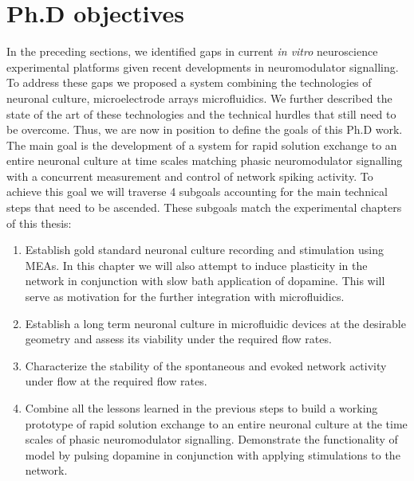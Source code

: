     \section{Ph.D objectives}
    In the preceding sections, we identified gaps in current \textit{in vitro} neuroscience experimental platforms given recent developments in neuromodulator signalling. To address these gaps we proposed a system combining the technologies of neuronal culture, microelectrode arrays microfluidics. We further described the state of the art of these technologies and the technical hurdles that still need to be overcome. Thus, we are now in position to define the goals of this Ph.D work. The main goal is the development of a system for rapid solution exchange to an entire neuronal culture at time scales matching phasic neuromodulator signalling with a concurrent measurement and control of network spiking activity. To achieve this goal we will traverse 4 subgoals accounting for the main technical steps that need to be ascended. These subgoals match the experimental chapters of this thesis:

    \begin{enumerate}
    \item Establish gold standard neuronal culture recording and stimulation using MEAs. In this chapter we will also attempt to induce plasticity in the network in conjunction with slow bath application of dopamine. This will serve as motivation for the further integration with microfluidics.

    \item Establish a long term neuronal culture in microfluidic devices at the desirable geometry and assess its viability under the required flow rates.

    \item Characterize the stability of the spontaneous and evoked network activity under flow at the required flow rates.

    \item Combine all the lessons learned in the previous steps to build a working prototype of rapid solution exchange to an entire neuronal culture at the time scales of phasic neuromodulator signalling. Demonstrate the functionality of model by pulsing dopamine in conjunction with applying stimulations to the network.
    \end{enumerate}


    \label{sec:introduction:objs}

